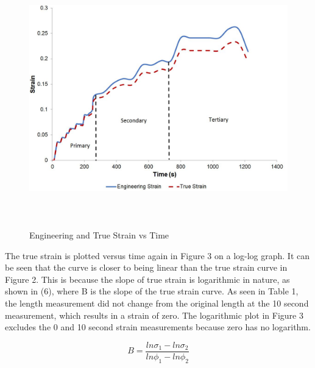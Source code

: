 \documentclass[12pt]{article}
\begin{document}
\begin{figure}[htbp] %
   \centering
   \includegraphics[width=\linewidth,height=4.4in]{creep_zones.jpg} 
   \caption{Engineering and True Strain vs Time}
\end{figure}
\bigskip


The true strain is plotted versus time again in Figure 3 on a log-log graph. It can be seen that the curve is closer to being linear than the true strain curve in Figure 2. This is because the slope of true strain is logarithmic in nature, as shown in (6), where B is the slope of the true strain curve. As seen in Table 1, the length measurement did not change from the original length at the 10 second measurement, which results in a strain of zero. The logarithmic plot in Figure 3 excludes the 0 and 10 second strain measurements because zero has no logarithm.
\bigskip


\begin{equation}
B = \frac{ln\sigma_{1}-ln\sigma_{2}}{ln\phi_{1}-ln\phi_{2}}
\end{equation}

\newpage
\end{document}
